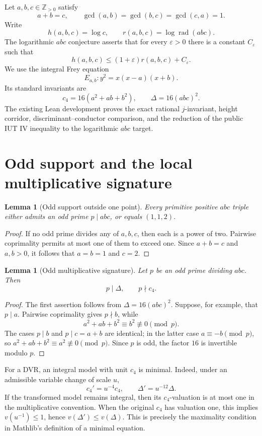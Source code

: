 \documentclass[11pt]{article}
\newtheorem{lemma}[theorem]{Lemma}
\newcommand{\Z}{\mathbb Z}
\newcommand{\rad}{\operatorname{rad}}
\begin{document}
Let $a,b,c\in\Z_{>0}$ satisfy
\[
  a+b=c,\qquad \gcd(a,b)=\gcd(b,c)=\gcd(c,a)=1.
\]
Write
\[
  h(a,b,c)=\log c,
  \qquad r(a,b,c)=\log\rad(abc).
\]
The logarithmic $abc$ conjecture asserts that for every $\varepsilon>0$ there
is a constant $C_\varepsilon$ such that
\[
  h(a,b,c)\le (1+\varepsilon)r(a,b,c)+C_\varepsilon.
\]
We use the integral Frey equation
\[
 E_{a,b}: y^2=x(x-a)(x+b).
\]
Its standard invariants are
\[
 c_4=16(a^2+ab+b^2),
 \qquad \Delta=16(abc)^2.
\]
The existing Lean development proves the exact rational $j$-invariant,
height corridor, discriminant--conductor comparison, and the reduction of the
public IUT IV inequality to the logarithmic $abc$ target.

\section{Odd support and the local multiplicative signature}

\begin{lemma}[Odd support outside one point]
Every primitive positive $abc$ triple either admits an odd prime
$p\mid abc$, or equals $(1,1,2)$.
\end{lemma}

\begin{proof}
If no odd prime divides any of $a,b,c$, then each is a power of two.  Pairwise
coprimality permits at most one of them to exceed one.  Since $a+b=c$ and
$a,b>0$, it follows that $a=b=1$ and $c=2$.
\end{proof}

\begin{lemma}[Odd multiplicative signature]
Let $p$ be an odd prime dividing $abc$.  Then
\[
 p\mid\Delta,
 \qquad p\nmid c_4.
\]
\end{lemma}

\begin{proof}
The first assertion follows from $\Delta=16(abc)^2$.  Suppose, for example,
that $p\mid a$.  Pairwise coprimality gives $p\nmid b$, while
\[
 a^2+ab+b^2\equiv b^2\not\equiv0\pmod p.
\]
The cases $p\mid b$ and $p\mid c=a+b$ are identical; in the latter case
$a\equiv-b\pmod p$, so
$a^2+ab+b^2\equiv a^2\not\equiv0\pmod p$.
Since $p$ is odd, the factor $16$ is invertible modulo $p$.
\end{proof}

For a DVR, an integral model with unit $c_4$ is minimal.  Indeed, under an
admissible variable change of scale $u$,
\[
 c_4' =u^{-4}c_4,
 \qquad \Delta'=u^{-12}\Delta.
\]
If the transformed model remains integral, then its $c_4$-valuation is at
most one in the multiplicative convention.  When the original $c_4$ has
valuation one, this implies $v(u^{-1})\le1$, hence
$v(\Delta')\le v(\Delta)$.  This is precisely the maximality condition in
Mathlib's definition of a minimal equation.
\end{document}
